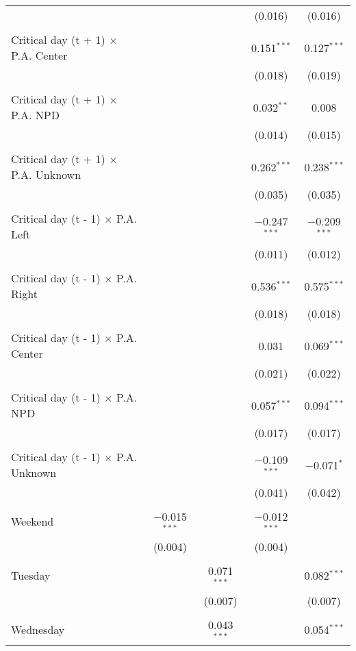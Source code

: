 \documentclass[
]{article}
\begin{document}
\begin{table}[!htbp]
{\begin{tabular}{@{\extracolsep{5pt}}lcccc}
  &  &  & (0.016) & (0.016) \\ 
  & & & & \\ 
 Critical day (t + 1) $\times$ P.A. Center &  &  & 0.151$^{***}$ & 0.127$^{***}$ \\ 
  &  &  & (0.018) & (0.019) \\ 
  & & & & \\ 
 Critical day (t + 1) $\times$ P.A. NPD &  &  & 0.032$^{**}$ & 0.008 \\ 
  &  &  & (0.014) & (0.015) \\ 
  & & & & \\ 
 Critical day (t + 1) $\times$ P.A. Unknown &  &  & 0.262$^{***}$ & 0.238$^{***}$ \\ 
  &  &  & (0.035) & (0.035) \\ 
  & & & & \\ 
 Critical day (t - 1) $\times$ P.A. Left &  &  & $-$0.247$^{***}$ & $-$0.209$^{***}$ \\ 
  &  &  & (0.011) & (0.012) \\ 
  & & & & \\ 
 Critical day (t - 1) $\times$ P.A. Right &  &  & 0.536$^{***}$ & 0.575$^{***}$ \\ 
  &  &  & (0.018) & (0.018) \\ 
  & & & & \\ 
 Critical day (t - 1) $\times$ P.A. Center &  &  & 0.031 & 0.069$^{***}$ \\ 
  &  &  & (0.021) & (0.022) \\ 
  & & & & \\ 
 Critical day (t - 1) $\times$ P.A. NPD &  &  & 0.057$^{***}$ & 0.094$^{***}$ \\ 
  &  &  & (0.017) & (0.017) \\ 
  & & & & \\ 
 Critical day (t - 1) $\times$ P.A. Unknown &  &  & $-$0.109$^{***}$ & $-$0.071$^{*}$ \\ 
  &  &  & (0.041) & (0.042) \\ 
  & & & & \\ 
 Weekend & $-$0.015$^{***}$ &  & $-$0.012$^{***}$ &  \\ 
  & (0.004) &  & (0.004) &  \\ 
  & & & & \\ 
 Tuesday &  & 0.071$^{***}$ &  & 0.082$^{***}$ \\ 
  &  & (0.007) &  & (0.007) \\ 
  & & & & \\ 
 Wednesday &  & 0.043$^{***}$ &  & 0.054$^{***}$ \\ 

\end{tabular}}
\end{table}
\end{document}
